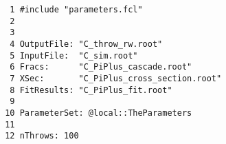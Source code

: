 \documentclass[12pt]{article}
\begin{document}
\begin{lstlisting}
  1 #include "parameters.fcl"                                                                                                        
  2                                                                                                                                  
  3                                                                                                                                  
  4 OutputFile: "C_throw_rw.root"                                                                                                  
  5 InputFile:  "C_sim.root"                                          
  6 Fracs:      "C_PiPlus_cascade.root"                                                                                              
  7 XSec:       "C_PiPlus_cross_section.root"                                                                                        
  8 FitResults: "C_PiPlus_fit.root"                                                                                                  
  9                                                                                                                                  
 10 ParameterSet: @local::TheParameters                                                                                              
 11                                                                                                                                  
 12 nThrows: 100  
\end{lstlisting}
\newpage
\end{document}
